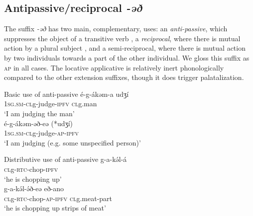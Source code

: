 
%

\subsection{Antipassive/reciprocal \textit{-əð}}\label{sec:ch11:antipassive}


The suffix \textit{-əð}  has two main, complementary, uses: an \textit{anti-passive}, which suppresses the object of a transitive verb , a \textit{reciprocal}, where there is mutual action by a plural subject , and a semi-reciprocal, where there is mutual action by two individuals towards a part of the other individual. We gloss this suffix as \textsc{ap} in all cases. The locative applicative is relatively inert phonologically compared to the other extension suffixes, though it does trigger palatalization. %

\ea Basic use of anti-passive
\ea \gll	é-g-ákəm-a 	udʒí  \\
	1\textsc{sg.sm-cl}g-judge-\textsc{ipfv}	\textsc{cl}g.man	\\
	\glt ‘I am judging the man’\\
\ex \gll	é-g-ákəm-əð-eə  (*udʒí)	\\
	1\textsc{sg.sm-cl}g-judge-\textsc{ap-\textsc{ipfv}} \\
	\glt ‘I am judging (e.g. some unspecified person)’\\ \label{ex:ch11:apb2}
\z 

\ex  Distributive use of anti-passive
\ea	g-a-kə́l-á		\\
	\textsc{cl}g-\textsc{rtc}-chop-\textsc{ipfv}\\
	\glt ‘he is chopping up’\\
\ex \gll	g-a-kə́l-ə́ð-eə 			eð-ano	\\
	\textsc{cl}g-\textsc{rtc}-chop-\textsc{ap-\textsc{ipfv}}	\textsc{cl}g.meat-part\\
	\glt ‘he is chopping up strips of meat’\\ \label{ex:ch11:apd2}
\z 

